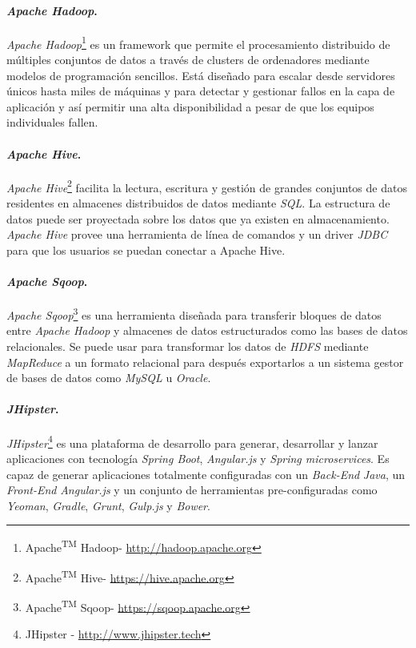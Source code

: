 \paragraph*{\textit{Apache Hadoop}.} \textit{Apache Hadoop}\footnote{Apache\textsuperscript{TM} Hadoop\textregistered - \url{http://hadoop.apache.org}} es un framework que permite el procesamiento distribuido de múltiples conjuntos de datos a través de clusters de ordenadores mediante modelos de programación sencillos. Está diseñado para escalar desde servidores únicos hasta miles de máquinas y para detectar y gestionar fallos en la capa de aplicación y así permitir una alta disponibilidad a pesar de que los equipos individuales fallen. 
\paragraph*{\textit{Apache Hive}.} \textit{Apache Hive}\footnote{Apache\textsuperscript{TM} Hive\textregistered - \url{https://hive.apache.org}} facilita la lectura, escritura y gestión de grandes conjuntos de datos residentes en almacenes distribuidos de datos mediante \textit{SQL}. La estructura de datos puede ser proyectada sobre los datos que ya existen en almacenamiento. \textit{Apache Hive} provee una herramienta de línea de comandos y un driver \textit{JDBC} para que los usuarios se puedan conectar a Apache Hive. 
\paragraph*{ \textit{Apache Sqoop}.} \textit{Apache Sqoop}\footnote{Apache\textsuperscript{TM} Sqoop\textregistered - \url{https://sqoop.apache.org}} es una herramienta diseñada para transferir bloques de datos entre \textit{Apache Hadoop} y almacenes de datos estructurados como las bases de datos relacionales. Se puede usar para transformar los datos de \textit{HDFS} mediante \textit{MapReduce} a un formato relacional para después exportarlos a un sistema gestor de bases de datos como \textit{MySQL} u \textit{Oracle}. 
\paragraph*{\textit{JHipster}.} \textit{JHipster}\footnote{JHipster - \url{http://www.jhipster.tech}} es una plataforma de desarrollo para generar, desarrollar y lanzar aplicaciones con tecnología \textit{Spring Boot}, \textit{Angular.js} y \textit{Spring microservices}. Es capaz de generar aplicaciones totalmente configuradas con un \textit{Back-End} \textit{Java}, un \textit{Front-End} \textit{Angular.js} y un conjunto de herramientas pre-configuradas como \textit{Yeoman}, \textit{Gradle}, \textit{Grunt}, \textit{Gulp.js} y \textit{Bower}.
